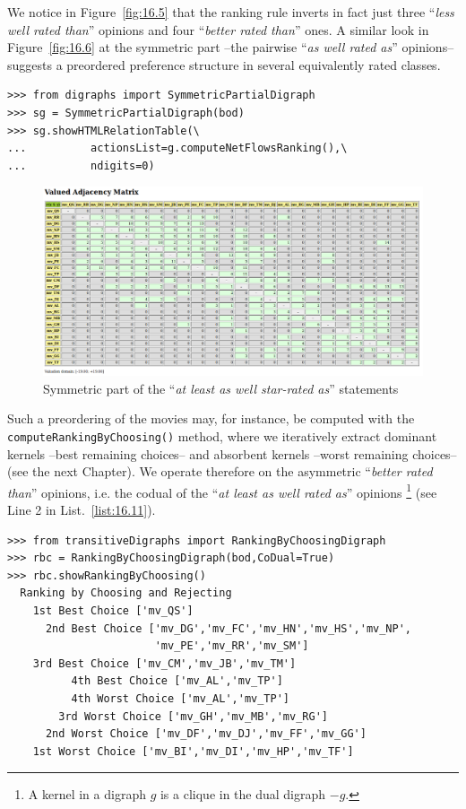 We notice in Figure~\vref{fig:16.5} that the \NetFlows ranking rule inverts in fact just three ``\emph{less well rated than}'' opinions and four ``\emph{better rated than}'' ones. A similar look in Figure~\vref{fig:16.6} at the symmetric part --the pairwise ``\emph{as well rated as}'' opinions-- suggests a preordered preference structure in several equivalently rated classes. 
\begin{lstlisting}
>>> from digraphs import SymmetricPartialDigraph
>>> sg = SymmetricPartialDigraph(bod)
>>> sg.showHTMLRelationTable(\
...          actionsList=g.computeNetFlowsRanking(),\
...          ndigits=0)
\end{lstlisting}
\begin{figure}[ht]
\includegraphics[width=\hsize]{Figures/16-6-symmetricPart.png}
\caption{Symmetric part of the ``\emph{at least as well star-rated as}'' statements}
\label{fig:16.6}       %
\end{figure}

Such a preordering of the movies may, for instance, be computed with the \texttt{compute\-RankingByChoosing()} method, where we iteratively extract dominant kernels --best remaining choices-- and absorbent kernels --worst remaining choices-- (see the next Chapter). We operate therefore on the asymmetric ``\emph{better rated than}'' opinions, i.e. the codual of the ``\emph{at least as well rated as}'' opinions \footnote{A kernel in a digraph $g$ is a clique in the dual digraph $-g$.} (see Line 2 in List.~\vref{list:16.11}).
\begin{lstlisting}[caption={Bipolar ranking-by-choosing the movies},label=list:16.11]
>>> from transitiveDigraphs import RankingByChoosingDigraph
>>> rbc = RankingByChoosingDigraph(bod,CoDual=True)
>>> rbc.showRankingByChoosing()
  Ranking by Choosing and Rejecting
    1st Best Choice ['mv_QS']
      2nd Best Choice ['mv_DG','mv_FC','mv_HN','mv_HS','mv_NP',
                       'mv_PE','mv_RR','mv_SM']
	3rd Best Choice ['mv_CM','mv_JB','mv_TM']
          4th Best Choice ['mv_AL','mv_TP']
          4th Worst Choice ['mv_AL','mv_TP']
        3rd Worst Choice ['mv_GH','mv_MB','mv_RG']
      2nd Worst Choice ['mv_DF','mv_DJ','mv_FF','mv_GG']
    1st Worst Choice ['mv_BI','mv_DI','mv_HP','mv_TF']
\end{lstlisting}

